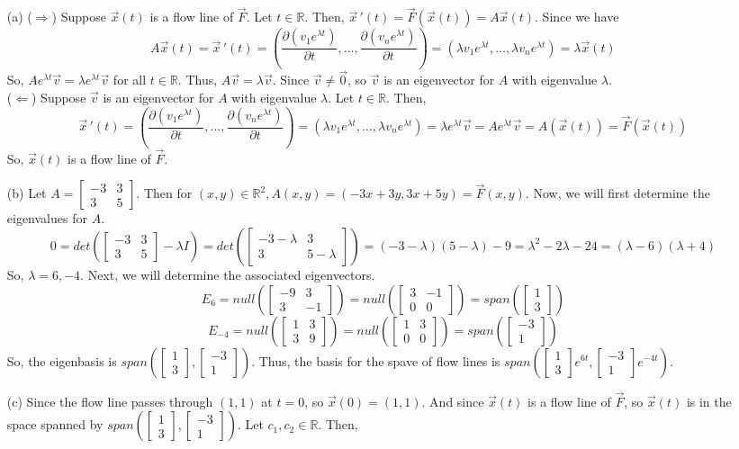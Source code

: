 \documentclass[11pt,letterpaper,cm]{nupset}
\newcommand{\bmat}[1]{\begin{bmatrix} #1 \end{bmatrix}}
\begin{document}
\begin{solution}
		\begin{itemize}
		\item[(a)]($\Rightarrow$) Suppose $\vec{x}(t)$ is a flow line of $\vec{F}$. Let $t\in\mathbb{R}$. Then, $\vec{x}\,'(t)=\vec{F}(\vec{x}(t))=A\vec{x}(t)$. Since we have
			$$A\vec{x}(t)=\vec{x}\,'(t)=(\frac{\partial(v_1e^{\lambda t})}{\partial t},\ldots,\frac{\partial(v_ne^{\lambda t})}{\partial t})=(\lambda v_1e^{\lambda t},\ldots,\lambda v_ne^{\lambda t})=\lambda\vec{x}(t)$$
			So, $Ae^{\lambda t}\vec{v}=\lambda e^{\lambda t}\vec{v}$ for all $t\in\mathbb{R}$. Thus, $A\vec{v}=\lambda\vec{v}$. Since $\vec{v}\neq\vec{0}$, so $\vec{v}$ is an eigenvector for $A$ with eigenvalue $\lambda$.\\
		($\Leftarrow$) Suppose $\vec{v}$ is an eigenvector for $A$ with eigenvalue $\lambda$. Let $t\in\mathbb{R}$. Then,
		$$\vec{x}\,'(t)=(\frac{\partial(v_1e^{\lambda t})}{\partial t},\ldots,\frac{\partial(v_ne^{\lambda t})}{\partial t})=(\lambda v_1e^{\lambda t},\ldots,\lambda v_ne^{\lambda t})=\lambda e^{\lambda t}\vec{v}=Ae^{\lambda t}\vec{v}=A(\vec{x}(t))=\vec{F}(\vec{x}(t))$$
		So, $\vec{x}(t)$ is a flow line of $\vec{F}$. 
		\item[(b)] Let $A=\bmat{-3 & 3\\3 & 5}$. Then for $(x,y)\in\mathbb{R}^2,A(x,y)=(-3x+3y,3x+5y)=\vec{F}(x,y)$. Now, we will first determine the eigenvalues for $A$.
			$$0=det(\bmat{-3 & 3\\3 & 5}-\lambda I)=det(\bmat{-3-\lambda & 3\\3 & 5-\lambda})=(-3-\lambda)(5-\lambda)-9=\lambda^2-2\lambda-24=(\lambda-6)(\lambda+4)$$
		So, $\lambda=6,-4$. Next, we will determine the associated eigenvectors.
		$$E_6=null(\bmat{-9 & 3\\3 & -1})=null(\bmat{3 & -1\\0 & 0})=span(\bmat{1\\3})$$
		$$E_{-4}=null(\bmat{1 & 3\\3 & 9})=null(\bmat{1 & 3\\0 & 0})=span(\bmat{-3\\1})$$
		So, the eigenbasis is $span(\bmat{1\\3},\bmat{-3\\1})$. Thus, the basis for the spave of flow lines is $span(\bmat{1\\3}e^{6t},\bmat{-3\\1}e^{-4t})$.
		\item[(c)] Since the flow line passes through $(1,1)$ at $t=0$, so $\vec{x}(0)=(1,1)$. And since $\vec{x}(t)$ is a flow line of $\vec{F}$, so $\vec{x}(t)$ is in the space spanned by $span(\bmat{1\\3},\bmat{-3\\1})$. Let $c_1,c_2\in\mathbb{R}$. Then,

\end{itemize}
\end{solution}
\end{document}
